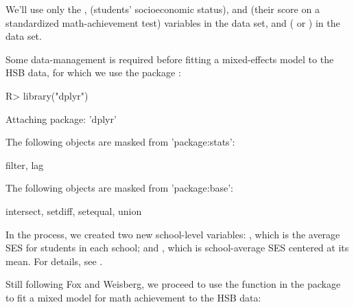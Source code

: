 \documentclass[
]{jss}
\begin{document}
We'll use only the ,  (students' socioeconomic
status), and  (their score on a standardized
math-achievement test) variables in the  data set, and
 ( or ) in the
 data set.

Some data-management is required before fitting a mixed-effects model to
the HSB data, for which we use the  package
\citep{WickhamEtAl:2023}:

\begin{CodeChunk}
\begin{CodeInput}
R> library("dplyr")
\end{CodeInput}
\begin{CodeOutput}

Attaching package: 'dplyr'
\end{CodeOutput}
\begin{CodeOutput}
The following objects are masked from 'package:stats':

    filter, lag
\end{CodeOutput}
\begin{CodeOutput}
The following objects are masked from 'package:base':

    intersect, setdiff, setequal, union
\end{CodeOutput}
\end{CodeChunk}

In the process, we created two new school-level variables:
, which is the average SES for students in each school;
and , which is school-average SES centered at its mean. For
details, see \citet[Sec. 7.2.2]{FoxWeisberg:2019}.

Still following Fox and Weisberg, we proceed to use the 
function in the  package \citep{BatesEtAl:2015} to fit a mixed
model for math achievement to the HSB data:
\end{document}
